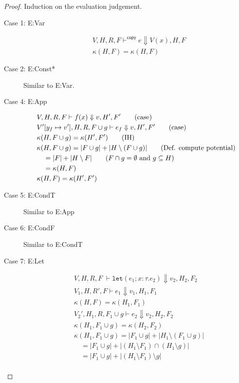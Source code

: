 \documentclass[11pt]{article}
\newcommand{\irl}[1]{\mathtt{#1}}
\theoremstyle{definition}
\begin{document}
\iffalse
\begin{proof}
Induction on the evaluation judgement.\\
\begin{description}
  \item[Case 1: E:Var]
  \begin{align*}
		&V,H,R,F \vdash^{\mathsf{copy}} e \Downarrow V(x),H,F \tag{case}\\
		&\kappa(H,F) = \kappa(H,F)
  \end{align*}
  \item[Case 2: E:Const*]
	Similar to E:Var.
  \item[Case 4: E:App]
  \begin{align*}
	&V,H,R,F \vdash {f}\mathtt{(}{x}\mathtt{)} \Downarrow v,H',F' \tag{case}\\
  &V'[y_f \mapsto v'],H,R,F \cup g \vdash e_f \Downarrow v,H',F' \tag{case}\\
	&\kappa(H,F\cup g) = \kappa(H',F') \tag{IH}\\
	&\kappa(H,F \cup g) = |F \cup g| + |H \setminus (F \cup g)| \tag{Def. compute potential}\\
	&\quad = |F| + |H \setminus F| \tag{$F \cap g = \emptyset$ and $g \subseteq H$}\\
	&\quad = \kappa(H,F)\\
	&\kappa(H,F) = \kappa(H',F')\\
  \end{align*}
  \item[Case 5: E:CondT]
	Similar to E:App
  \item[Case 6: E:CondF] 
  Similar to E:CondT
  \item[Case 7: E:Let]
  \begin{align*}
  &V,H,R,F \; \vdash \irl{let}(e_1; x : \tau.e_2) \Downarrow v_2,H_2,F_2 \tag{case}\\
	&V_1,H,R',F \vdash e_1 \Downarrow v_1,H_1,F_1 \tag{case}\\
	&\kappa(H,F) = \kappa(H_1,F_1) \tag{IH}\\
  &V_2',H_1,R, F_1 \cup g \vdash e_2 \Downarrow v_2,H_2,F_2 \tag{case}\\
	&\kappa(H_1, F_1 \cup g) = \kappa(H_2,F_2) \tag{IH}\\
	&\kappa(H_1, F_1 \cup g) = |F_1 \cup g| + |H_1 \setminus (F_1 \cup g)| \tag{Def. compute potential}\\
	&\quad = |F_1 \cup g| + |(H_1 \setminus F_1) \cap (H_1 \setminus g)|\\
	&\quad = |F_1 \cup g| + |(H_1 \setminus F_1) \setminus g|\\

\end{align*}
\end{description}
\end{proof}
\end{document}
